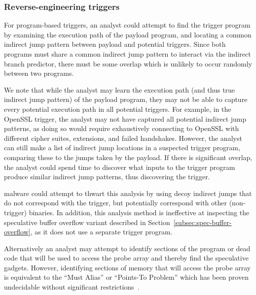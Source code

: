 \subsubsection{Reverse-engineering triggers}
For program-based triggers, an analyst could attempt to find the trigger program
by examining the execution path of the payload program, and locating a common
indirect jump pattern between payload and potential triggers. Since both
programs must share a common indirect jump pattern to interact via the indirect
branch predictor, there must be some overlap which is unlikely to occur randomly
between two programs.

We note that while the analyst may learn the execution path (and thus true
indirect jump pattern) of the payload program, they may not be able to capture
every potential execution path in all potential triggers. For example, in the
OpenSSL trigger, the analyst may not have captured all potential indirect jump
patterns, as doing so would require exhaustively connecting to OpenSSL with
different cipher suites, extensions, and failed handshakes. However, the analyst
can still make a list of indirect jump locations in a suspected trigger program,
comparing these to the jumps taken by the payload. If there is significant
overlap, the analyst could spend time to discover what inputs to the trigger
program produce similar indirect jump patterns, thus discovering the trigger.

\speculake malware could attempt to thwart this analysis by using decoy indirect
jumps that do not correspond with the trigger, but potentially correspond with
other (non-trigger) binaries. In addition, this analysis method is ineffective
at inspecting the speculative buffer overflow variant described in
Section~\ref{subsec:spec-buffer-overflow}, as it does not use a separate trigger
program.

Alternatively an analyst may attempt to identify sections of the program or dead 
code that will be used to access the probe array and thereby find the speculative 
gadgets. However, identifying sections of memory that will access the probe 
array is equivalent to the ``Must Alias'' or ``Points-To Problem'' which has been 
proven undecidable without significant 
restrictions~\cite{ramalingam1994undecidability,landi1992undecidability}.

%
%


